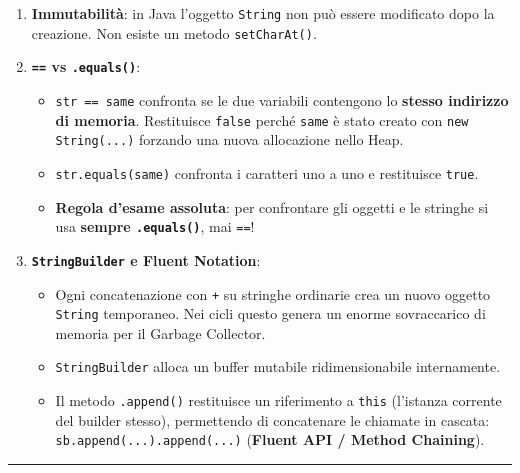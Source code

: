 \documentclass[11pt,a4paper,oneside]{report}
\newcommand{\passthrough}[1]{#1}
\providecommand{\tightlist}{\setlength{\itemsep}{0pt}\setlength{\parskip}{0pt}}
\begin{document}
\begin{enumerate}
\def\labelenumi{\arabic{enumi}.}
\tightlist
\item
  \textbf{Immutabilità}: in Java l'oggetto
  \passthrough{\lstinline!String!} non può essere modificato dopo la
  creazione. Non esiste un metodo \passthrough{\lstinline!setCharAt()!}.
\item
  \textbf{\passthrough{\lstinline!==!} vs
  \passthrough{\lstinline!.equals()!}}:

  \begin{itemize}
  \tightlist
  \item
    \passthrough{\lstinline!str == same!} confronta se le due variabili
    contengono lo \textbf{stesso indirizzo di memoria}. Restituisce
    \passthrough{\lstinline!false!} perché
    \passthrough{\lstinline!same!} è stato creato con
    \passthrough{\lstinline!new String(...)!} forzando una nuova
    allocazione nello Heap.
  \item
    \passthrough{\lstinline!str.equals(same)!} confronta i caratteri uno
    a uno e restituisce \passthrough{\lstinline!true!}.
  \item
    \textbf{Regola d'esame assoluta}: per confrontare gli oggetti e le
    stringhe si usa \textbf{sempre \passthrough{\lstinline!.equals()!}},
    mai \passthrough{\lstinline!==!}!
  \end{itemize}
\item
  \textbf{\passthrough{\lstinline!StringBuilder!} e Fluent Notation}:

  \begin{itemize}
  \tightlist
  \item
    Ogni concatenazione con \passthrough{\lstinline!+!} su stringhe
    ordinarie crea un nuovo oggetto \passthrough{\lstinline!String!}
    temporaneo. Nei cicli questo genera un enorme sovraccarico di
    memoria per il Garbage Collector.
  \item
    \passthrough{\lstinline!StringBuilder!} alloca un buffer mutabile
    ridimensionabile internamente.
  \item
    Il metodo \passthrough{\lstinline!.append()!} restituisce un
    riferimento a \passthrough{\lstinline!this!} (l'istanza corrente del
    builder stesso), permettendo di concatenare le chiamate in cascata:
    \passthrough{\lstinline!sb.append(...).append(...)!} (\textbf{Fluent
    API / Method Chaining}).
  \end{itemize}
\end{enumerate}

\begin{center}\rule{0.5\linewidth}{0.5pt}\end{center}
\end{document}
